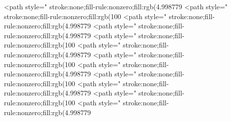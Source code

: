<path style=" stroke:none;fill-rule:nonzero;fill:rgb(4.998779%
<path style=" stroke:none;fill-rule:nonzero;fill:rgb(100%
<path style=" stroke:none;fill-rule:nonzero;fill:rgb(4.998779%
<path style=" stroke:none;fill-rule:nonzero;fill:rgb(4.998779%
<path style=" stroke:none;fill-rule:nonzero;fill:rgb(100%
<path style=" stroke:none;fill-rule:nonzero;fill:rgb(4.998779%
<path style=" stroke:none;fill-rule:nonzero;fill:rgb(100%
<path style=" stroke:none;fill-rule:nonzero;fill:rgb(4.998779%
<path style=" stroke:none;fill-rule:nonzero;fill:rgb(100%
<path style=" stroke:none;fill-rule:nonzero;fill:rgb(4.998779%
<path style=" stroke:none;fill-rule:nonzero;fill:rgb(100%
<path style=" stroke:none;fill-rule:nonzero;fill:rgb(4.998779%
